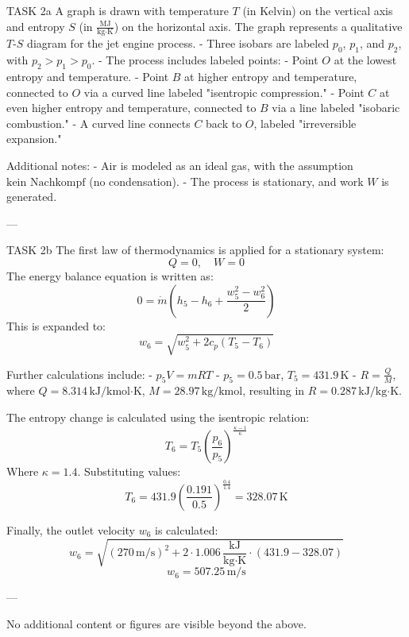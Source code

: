 TASK 2a  
A graph is drawn with temperature \( T \) (in Kelvin) on the vertical axis and entropy \( S \) (in \( \frac{\text{MJ}}{\text{kg·K}} \)) on the horizontal axis. The graph represents a qualitative \( T \)-\( S \) diagram for the jet engine process.  
- Three isobars are labeled \( p_0 \), \( p_1 \), and \( p_2 \), with \( p_2 > p_1 > p_0 \).  
- The process includes labeled points:  
  - Point \( O \) at the lowest entropy and temperature.  
  - Point \( B \) at higher entropy and temperature, connected to \( O \) via a curved line labeled "isentropic compression."  
  - Point \( C \) at even higher entropy and temperature, connected to \( B \) via a line labeled "isobaric combustion."  
  - A curved line connects \( C \) back to \( O \), labeled "irreversible expansion."  

Additional notes:  
- Air is modeled as an ideal gas, with the assumption \( \text{kein Nachkompf} \) (no condensation).  
- The process is stationary, and work \( W \) is generated.  

---

TASK 2b  
The first law of thermodynamics is applied for a stationary system:  
\[
Q = 0, \quad W = 0
\]  
The energy balance equation is written as:  
\[
0 = \dot{m} \left( h_5 - h_6 + \frac{w_5^2 - w_6^2}{2} \right)
\]  
This is expanded to:  
\[
w_6 = \sqrt{w_5^2 + 2 c_p (T_5 - T_6)}
\]  

Further calculations include:  
- \( p_5 V = m R T \)  
- \( p_5 = 0.5 \, \text{bar} \), \( T_5 = 431.9 \, \text{K} \)  
- \( R = \frac{Q}{M} \), where \( Q = 8.314 \, \text{kJ/kmol·K} \), \( M = 28.97 \, \text{kg/kmol} \), resulting in \( R = 0.287 \, \text{kJ/kg·K} \).  

The entropy change is calculated using the isentropic relation:  
\[
T_6 = T_5 \left( \frac{p_6}{p_5} \right)^{\frac{\kappa - 1}{\kappa}}
\]  
Where \( \kappa = 1.4 \). Substituting values:  
\[
T_6 = 431.9 \left( \frac{0.191}{0.5} \right)^{\frac{0.4}{1.4}} = 328.07 \, \text{K}
\]  

Finally, the outlet velocity \( w_6 \) is calculated:  
\[
w_6 = \sqrt{(270 \, \text{m/s})^2 + 2 \cdot 1.006 \, \frac{\text{kJ}}{\text{kg·K}} \cdot (431.9 - 328.07)}
\]  
\[
w_6 = 507.25 \, \text{m/s}
\]  

---

No additional content or figures are visible beyond the above.
